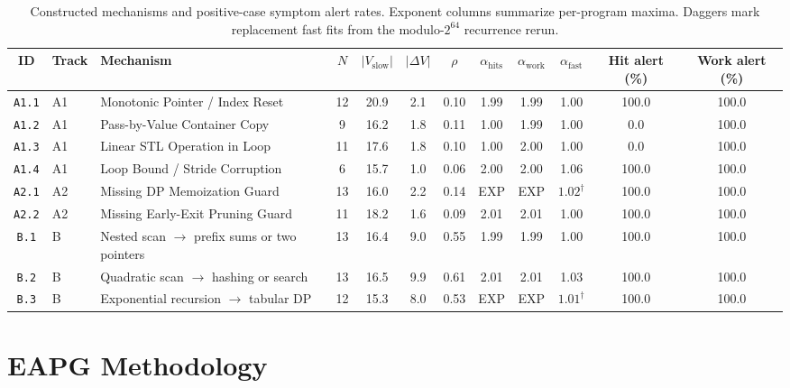 \documentclass[10pt,conference]{IEEEtran}
\begin{document}
\begin{table}[t]
\centering
\small
\caption{Constructed mechanisms and positive-case symptom alert rates. Exponent columns summarize per-program maxima. Daggers mark replacement fast fits from the modulo-$2^{64}$ recurrence rerun.}
\label{tab:pilot_mechanisms}
\setlength{\tabcolsep}{3pt}
\begin{tabular}{@{}cllccccccccc@{}}
\toprule
\textbf{ID} & \textbf{Track} & \textbf{Mechanism} & \textbf{$N$} & \textbf{$|V_{\text{slow}}|$} & \textbf{$|\Delta V|$} & \textbf{$\rho$} & \textbf{$\alpha_{\text{hits}}$} & \textbf{$\alpha_{\text{work}}$} & \textbf{$\alpha_{\text{fast}}$} & \textbf{Hit alert (\%)} & \textbf{Work alert (\%)} \\
\midrule
\texttt{A1.1} & A1 & Monotonic Pointer / Index Reset & 12 & 20.9 & 2.1 & 0.10 & 1.99 & 1.99 & 1.00 & 100.0 & 100.0 \\
\texttt{A1.2} & A1 & Pass-by-Value Container Copy & 9 & 16.2 & 1.8 & 0.11 & 1.00 & 1.99 & 1.00 & 0.0 & 100.0 \\
\texttt{A1.3} & A1 & Linear STL Operation in Loop & 11 & 17.6 & 1.8 & 0.10 & 1.00 & 2.00 & 1.00 & 0.0 & 100.0 \\
\texttt{A1.4} & A1 & Loop Bound / Stride Corruption & 6 & 15.7 & 1.0 & 0.06 & 2.00 & 2.00 & 1.06 & 100.0 & 100.0 \\
\midrule
\texttt{A2.1} & A2 & Missing DP Memoization Guard & 13 & 16.0 & 2.2 & 0.14 & EXP & EXP & $1.02^{\dagger}$ & 100.0 & 100.0 \\
\texttt{A2.2} & A2 & Missing Early-Exit Pruning Guard & 11 & 18.2 & 1.6 & 0.09 & 2.01 & 2.01 & 1.00 & 100.0 & 100.0 \\
\midrule
\texttt{B.1} & B & Nested scan $\to$ prefix sums or two pointers & 13 & 16.4 & 9.0 & 0.55 & 1.99 & 1.99 & 1.00 & 100.0 & 100.0 \\
\texttt{B.2} & B & Quadratic scan $\to$ hashing or search & 13 & 16.5 & 9.9 & 0.61 & 2.01 & 2.01 & 1.03 & 100.0 & 100.0 \\
\texttt{B.3} & B & Exponential recursion $\to$ tabular DP & 12 & 15.3 & 8.0 & 0.53 & EXP & EXP & $1.01^{\dagger}$ & 100.0 & 100.0 \\
\bottomrule
\end{tabular}
\end{table}

\section{EAPG Methodology}
\label{sec:methodology}
\end{document}
